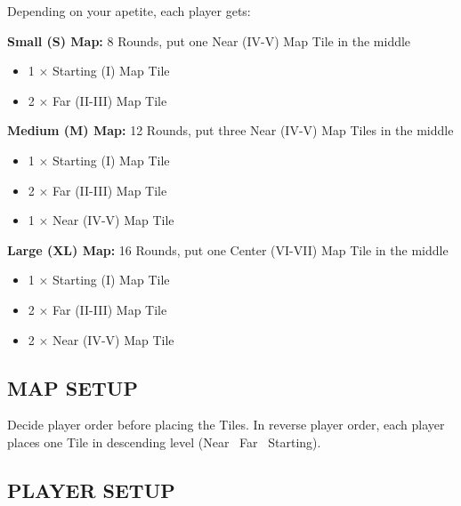 \begin{multicols*}{2}
Depending on your apetite, each player gets:

\textbf{Small (S) Map:} 8 Rounds, put one Near (IV-V) Map Tile in the middle
\begin{itemize}
  \item 1 × Starting (I) Map Tile
  \item 2 × Far (II-III) Map Tile
\end{itemize}

\textbf{Medium (M) Map:} 12 Rounds, put three Near (IV-V) Map Tiles in the middle
\begin{itemize}
  \item 1 × Starting (I) Map Tile
  \item 2 × Far (II-III) Map Tile
  \item 1 × Near (IV-V) Map Tile
\end{itemize}

\textbf{Large (XL) Map:} 16 Rounds, put one Center (VI-VII) Map Tile in the middle
\begin{itemize}
  \item 1 × Starting (I) Map Tile
  \item 2 × Far (II-III) Map Tile
  \item 2 × Near (IV-V) Map Tile
\end{itemize}

\subsection*{\MakeUppercase{Map Setup}}

Decide player order before placing the Tiles.
In reverse player order, each player places one Tile in descending level (Near \rightarrow\ Far \rightarrow\ Starting).  %


\end{multicols*}

\subsection*{\MakeUppercase{Player Setup}}

